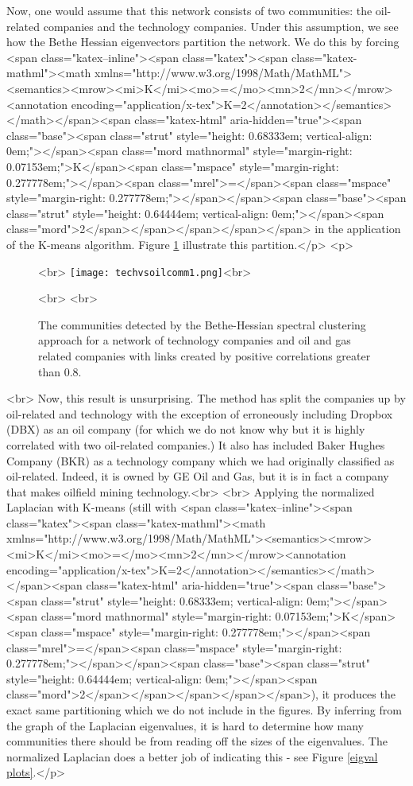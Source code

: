 Now, one would assume that this network consists of two communities: the oil-related companies and the technology companies. Under this assumption, we see how the Bethe Hessian eigenvectors partition the network. We do this by forcing <span class="katex--inline"><span class="katex"><span class="katex-mathml"><math xmlns="http://www.w3.org/1998/Math/MathML"><semantics><mrow><mi>K</mi><mo>=</mo><mn>2</mn></mrow><annotation encoding="application/x-tex">K=2</annotation></semantics></math></span><span class="katex-html" aria-hidden="true"><span class="base"><span class="strut" style="height: 0.68333em; vertical-align: 0em;"></span><span class="mord mathnormal" style="margin-right: 0.07153em;">K</span><span class="mspace" style="margin-right: 0.277778em;"></span><span class="mrel">=</span><span class="mspace" style="margin-right: 0.277778em;"></span></span><span class="base"><span class="strut" style="height: 0.64444em; vertical-align: 0em;"></span><span class="mord">2</span></span></span></span></span> in the application of the K-means algorithm. Figure \ref{techvsoilcomm1} illustrate this partition.</p>
<p>\begin{figure}[h]%
\centering<br>
\texttt{[image: techvsoilcomm1.png]}<br>
\caption{The communities detected by the Bethe-Hessian spectral clustering approach for a network of technology companies and oil and gas related companies with links created by positive correlations greater than 0.8.}<br>
\label{techvsoilcomm1}<br>
\end{figure}<br>
Now, this result is unsurprising. The method has split the companies up by oil-related and technology with the exception of erroneously including Dropbox (DBX) as an oil company (for which we do not know why but it is highly correlated with two oil-related companies.) It also has included Baker Hughes Company (BKR) as a technology company which we had originally classified as oil-related. Indeed, it is owned by GE Oil and Gas, but it is in fact a company that makes oilfield mining technology.<br>
\newline<br>
Applying the normalized Laplacian with K-means (still with <span class="katex--inline"><span class="katex"><span class="katex-mathml"><math xmlns="http://www.w3.org/1998/Math/MathML"><semantics><mrow><mi>K</mi><mo>=</mo><mn>2</mn></mrow><annotation encoding="application/x-tex">K=2</annotation></semantics></math></span><span class="katex-html" aria-hidden="true"><span class="base"><span class="strut" style="height: 0.68333em; vertical-align: 0em;"></span><span class="mord mathnormal" style="margin-right: 0.07153em;">K</span><span class="mspace" style="margin-right: 0.277778em;"></span><span class="mrel">=</span><span class="mspace" style="margin-right: 0.277778em;"></span></span><span class="base"><span class="strut" style="height: 0.64444em; vertical-align: 0em;"></span><span class="mord">2</span></span></span></span></span>), it produces the exact same partitioning which we do not include in the figures. By inferring from the graph of the Laplacian eigenvalues, it is hard to determine how many communities there should be from reading off the sizes of the eigenvalues. The normalized Laplacian does a better job of indicating this - see Figure \ref{eigval plots}.</p>
